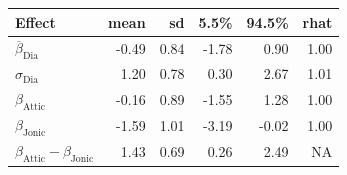 
\begin{tabular}[t]{lrrrrr}
\toprule
Effect & mean & sd & 5.5\% & 94.5\% & rhat\\
\midrule
$\overline{\beta}_{\text{Dia}}$ & -0.49 & 0.84 & -1.78 & 0.90 & 1.00\\
$\sigma_{\text{Dia}}$ & 1.20 & 0.78 & 0.30 & 2.67 & 1.01\\
$\beta_{\text{Attic}}$ & -0.16 & 0.89 & -1.55 & 1.28 & 1.00\\
$\beta_{\text{Jonic}}$ & -1.59 & 1.01 & -3.19 & -0.02 & 1.00\\
$\beta_{\text{Attic}} - \beta_{\text{Jonic}}$ & 1.43 & 0.69 & 0.26 & 2.49 & NA\\
\bottomrule
\end{tabular}
